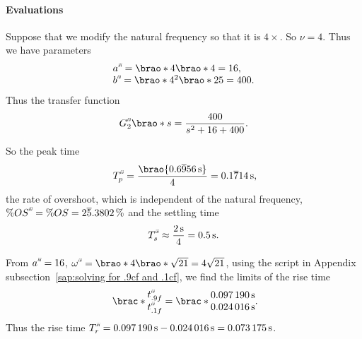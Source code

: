 \documentclass[12pt]{article}
\newcommand*\siexpr[2][]{\SI[parse-numbers=false,#1]{#2}}%
\DeclarePairedDelimiter\brao()%
\DeclarePairedDelimiter\brac[]%
\newcommand{\setprime}[2][1]{%
    {#2}^{%
        \raisebox{1pt}{%
            \scalebox{0.5}{%
                \itshape\sffamily\uppercase%
                \expandafter{%
                    \romannumeral#1%
                }%
            }%
        }
    }%
}%
\begin{document}
\begin{enumerate}[(a)]
        \paragraph{Evaluations}
        Suppose that we modify the natural frequency so that it is $4\times$.
        So $\nu = 4$. Thus we have parameters
        \begin{equation}
            \begin{array}{@{}l@{}}
                \setprime[3]a = \brao*4\brao*4 = 16,
            \\*
                \setprime[3]b = \brao*4^2 \brao*{25} = 400.
            \\*
            \end{array}
        \end{equation}
        Thus the transfer function
        \begin{equation}
            \setprime[3]G_2\brao*s = \frac{400}{s^2 + 16 + 400}.
        \end{equation}

        So the peak time
        \begin{equation}
              \setprime[3]T_p
            = \frac{\brao{\siexpr{0.6\overline956}\second}}{4}
            = \siexpr{0.1\overline714}\second\rlap,
        \end{equation}
        the rate of overshoot, which is independent of the natural frequency,
        $\%\setprime[3]{OS} = \%OS = \siexpr{2\overline5.3802}\percent$
        and the settling time
        \begin{equation}
                    \setprime[3]T_s
            \approx \frac{\SI2\second}4
                  = \SI{0.5}\second.
        \end{equation}

        From $\setprime[3]a = 16$, $\setprime[3]\omega = \brao*{4}\brao*{\sqrt{21}} = 4\sqrt{21}$,
        using the script in Appendix subsection~\ref{sap:solving for .9cf and .1cf},
        we find the limits of the rise time
        \begin{equation}
            \brac*{
                \begin{matrix}
                    \setprime[3]t_{.9f} \\*
                    \setprime[3]t_{.1f} \\*
                \end{matrix}
            }
            =
            \brac*{
                \begin{matrix}
                    \SI{0.097190}\second \\*
                    \SI{0.024016}\second \\*
                \end{matrix}
            }\rlap.
        \end{equation}
        Thus the rise time $\setprime[3]T_r = \SI{0.097190}\second - \SI{0.024016}\second = \SI{0.073175}\second$.


\end{enumerate}
\end{document}
